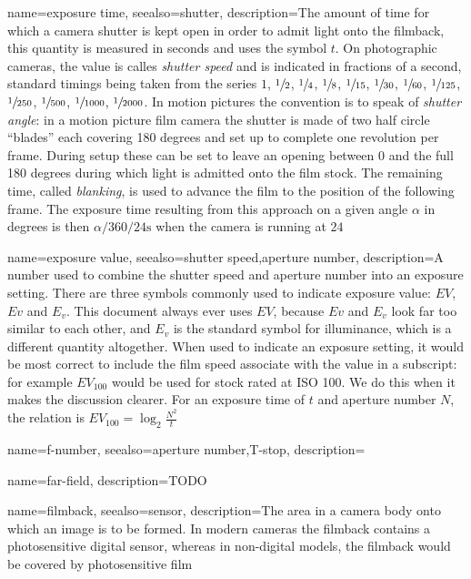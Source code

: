 {
	name={exposure time},
	seealso={shutter},
	description={The amount of time for which a camera shutter is kept open in order to
		admit light onto the filmback, this quantity is measured in seconds and uses the
		symbol $t$. 
		On photographic cameras, the value is calles \textsl{shutter speed} and is 
		indicated in fractions of a second, standard timings being
		taken from the series $1$, $\sfrac12$, $\sfrac14$, $\sfrac18$, 
		$\sfrac1{15}$, $\sfrac1{30}$, $\sfrac1{60}$, $\sfrac1{125}$, 
		$\sfrac1{250}$, $\sfrac1{500}$, $\sfrac1{1000}$, $\sfrac1{2000}$.
		In motion pictures the convention is to speak of \textsl{shutter angle}:
		in a motion picture film camera the shutter is made of two half circle ``blades'' 
		each covering 180 degrees and set up to complete one revolution per frame. 
		During setup these can be set to leave an opening between 0 and the
		full 180 degrees during which light is admitted onto the film stock.
		The remaining time, called \textsl{blanking}, is used to advance the film
		to the position of the following frame. The exposure time resulting from this 
		approach on a given angle $\alpha$ in degrees is then $\alpha/360/24 \unit{\second}$
		when the camera is running at $24$ }
}

{
	name={exposure value},
	seealso={shutter speed,aperture number},
	description={A number used to combine the shutter speed and aperture number into an
		exposure setting. 
		There are three symbols commonly used to indicate exposure value: $EV$, $Ev$ and $E_v$.
		This document always ever uses $EV$, because $Ev$ and $E_v$ look far too similar to each other, and $E_v$ is the standard symbol for \gls{illuminance}, which is a different
		quantity altogether.
		When used to indicate an exposure setting, it would be most correct to include 
		the film speed associate with the value in a subscript: for example $EV_{100}$ 
		would be used for stock rated at ISO 100. 
		We do this when it makes the discussion clearer.
		For an exposure time of $t$ and aperture number $N$, the relation is
		$EV_{100} = \log_2\frac{N^2}{t}$}
}

{
	name={f-number},
	seealso={aperture number,T-stop},
	description=\nopostdesc
}

{
	name={far-field},
	description={TODO}
}


{
	name=filmback,
	seealso={sensor},
	description={The area in a camera body onto which an image is to be formed. 
		In modern cameras the filmback contains a photosensitive digital sensor,
		whereas in non-digital models, the filmback would be covered by 
		photosensitive film}
}

